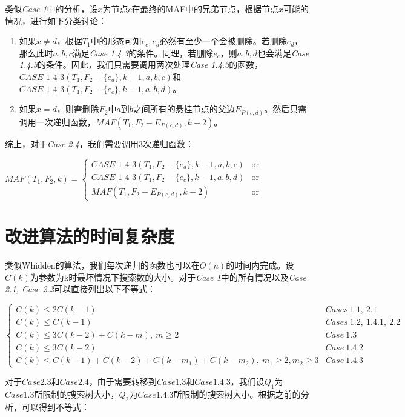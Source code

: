 类似\textit{Case 1}中的分析，设$x$为节点$c$在最终的MAF中的兄弟节点，根据节点$x$可能的情况，进行如下分类讨论：
\begin{enumerate}
	\item 如果$x \neq d$，根据$T_1$中的形态可知$e_c,e_d$必然有至少一个会被删除。若删除$e_d$，那么此时$a,b,c$满足\textit{Case 1.4.3}的条件。同理，若删除$e_c$，则$a,b,d$也会满足\textit{Case 1.4.3}的条件。因此，我们只需要调用两次处理\textit{Case 1.4.3}的函数，$CASE\_1\_4\_3(T_1,F_2-\{e_d\},k-1,a,b,c)$和$CASE\_1\_4\_3(T_1,F_2-\{e_c\},k-1,a,b,d)$。
	\item 如果$x = d$，则需删除$F_2$中$a$到$b$之间所有的悬挂节点的父边$E_{P(c,d)}$。然后只需调用一次递归函数，$MAF(T_1,F_2-E_{P(c,d)},k-2)$。
\end{enumerate}

综上，对于\textit{Case 2.4}，我们需要调用3次递归函数：
\begin{center}
$MAF(T_1,F_2,k) = \left\{
\begin{array}{lr}
         CASE\_1\_4\_3(T_1,F_2-\{e_d\},k-1,a,b,c) & \mbox{or}\\ 
         CASE\_1\_4\_3(T_1,F_2-\{e_c\},k-1,a,b,d) & \mbox{or}\\
         MAF(T_1,F_2-E_{P(c,d)},k-2) & \mbox{or}
\end{array}
\right.$
\end{center}


\section{改进算法的时间复杂度}

类似Whidden的算法，我们每次递归的函数也可以在$O(n)$的时间内完成。设$C(k)$为参数为k时最坏情况下搜索数的大小。对于\textit{Case 1}中的所有情况以及\textit{Case 2.1, Case 2.2}可以直接列出以下不等式：
\begin{center}
$\left\{
\begin{array}{lr}
	C(k) \le 2C(k-1) & Cases~1.1,~2.1\\
	C(k) \le C(k-1) &  Cases~1.2,~1.4.1,~2.2\\
	C(k) \le 3C(k-2) + C(k-m),~m \ge 2 & Case~1.3 \\
	C(k) \le 3C(k-2) & Case~1.4.2 \\
	C(k) \le C(k-1)+C(k-2) + C(k-m_1) + C(k-m_2),~m_1 \ge 2, m_2 \ge 3 & Case~1.4.3
\end{array}
\right.$
\end{center}

对于$Case 2.3$和$Case 2.4$，由于需要转移到$Case 1.3$和$Case 1.4.3$，我们设$Q_1$为$Case 1.3$所限制的搜索树大小，$Q_2$为$Case 1.4.3$所限制的搜索树大小。根据之前的分析，可以得到不等式：

